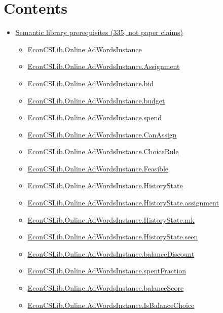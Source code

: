 \documentclass[10pt]{article}
\begin{document}
\section*{Contents}
\begin{itemize}[leftmargin=1.2em]
\item \hyperlink{library-section-848450770c62960b}{Semantic library prerequisites (335; not paper claims)}
\begin{itemize}[leftmargin=1.2em]
\item \hyperlink{library-prerequisite-bcbbd6da9ce2dcc7}{EconCSLib.Online.AdWordsInstance}
\item \hyperlink{library-prerequisite-7fc3d500f9037f9a}{EconCSLib.Online.AdWordsInstance.Assignment}
\item \hyperlink{library-prerequisite-1e2e29d6f98974d7}{EconCSLib.Online.AdWordsInstance.bid}
\item \hyperlink{library-prerequisite-7e00805057e0cd3b}{EconCSLib.Online.AdWordsInstance.budget}
\item \hyperlink{library-prerequisite-1253f3b1f8ef8eb0}{EconCSLib.Online.AdWordsInstance.spend}
\item \hyperlink{library-prerequisite-8d10111219674c58}{EconCSLib.Online.AdWordsInstance.CanAssign}
\item \hyperlink{library-prerequisite-6573559094e54df9}{EconCSLib.Online.AdWordsInstance.ChoiceRule}
\item \hyperlink{library-prerequisite-34cec9636dfd72f5}{EconCSLib.Online.AdWordsInstance.Feasible}
\item \hyperlink{library-prerequisite-f273c12cc702f568}{EconCSLib.Online.AdWordsInstance.HistoryState}
\item \hyperlink{library-prerequisite-cb4d15767e8c0176}{EconCSLib.Online.AdWordsInstance.HistoryState.assignment}
\item \hyperlink{library-prerequisite-a8ddc35350229444}{EconCSLib.Online.AdWordsInstance.HistoryState.mk}
\item \hyperlink{library-prerequisite-54ae0d0ab3d3743e}{EconCSLib.Online.AdWordsInstance.HistoryState.seen}
\item \hyperlink{library-prerequisite-3b0f75ceb73c02cb}{EconCSLib.Online.AdWordsInstance.balanceDiscount}
\item \hyperlink{library-prerequisite-bd7f34f7832c277e}{EconCSLib.Online.AdWordsInstance.spentFraction}
\item \hyperlink{library-prerequisite-9b016ce72a568f03}{EconCSLib.Online.AdWordsInstance.balanceScore}
\item \hyperlink{library-prerequisite-dbc0d4391a41badc}{EconCSLib.Online.AdWordsInstance.IsBalanceChoice}

\end{itemize}
\end{itemize}
\end{document}
